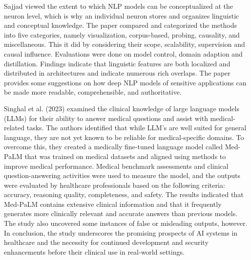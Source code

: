 \vspace{1em} 
Sajjad viewed the extent to which NLP models can be conceptualized at the neuron level, which is why an individual neuron stores and organizes linguistic and conceptual knowledge\cite{Sajjad2022}. The paper compared and categorized the methods into five categories, namely visualization, corpus-based, probing, causality, and miscellaneous. This it did by considering their scope, scalability, supervision and causal influence. Evaluations were done on model control, domain adaption and distillation. Findings indicate that linguistic features are both localized and distributed in architectures and indicate numerous rich overlaps. The paper provides some suggestions on how deep NLP models of sensitive applications can be made more readable, comprehensible, and authoritative.

\vspace{1em}
Singhal et al. (2023) examined the clinical knowledge of large language models (LLMs) for their ability to answer medical questions and assist with medical-related tasks\cite{singhal2023llmclinical}. The authors identified that while LLM's are well suited for general language, they are not yet known to be reliable for medical-specific domains. To overcome this, they created a medically fine-tuned language model called Med-PaLM that was trained on medical datasets and aligned using methods to improve medical performance. Medical benchmark assessments and clinical question-answering activities were used to measure the model, and the outputs were evaluated by healthcare professionals based on the following criteria: accuracy, reasoning quality, completeness, and safety. The results indicated that Med-PaLM contains extensive clinical information and that it frequently generates more clinically relevant and accurate answers than previous models. The study also uncovered some instances of false or misleading outputs, however. In conclusion, the study underscores the promising prospects of AI systems in healthcare and the necessity for continued development and security enhancements before their clinical use in real-world settings.

